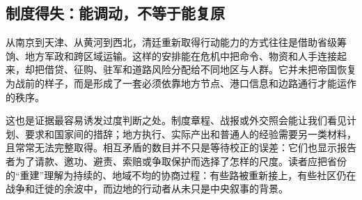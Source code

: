 \subsection{制度得失：能调动，不等于能复原}

从南京到天津、从黄河到西北，清廷重新取得行动能力的方式往往是借助省级筹饷、地方军政和跨区域运输。这样的安排能在危机中把命令、物资和人手连接起来，却把借贷、征购、驻军和道路风险分配给不同地区与人群。它并未把帝国恢复为战前的样子，而是形成了一套必须依靠地方节点、港口信息和边路通行才能运作的秩序。

这也是证据最容易诱发过度判断之处。制度章程、战报或外交照会能让我们看见计划、要求和国家间的措辞；地方执行、实际产出和普通人的经验需要另一类材料，且常常无法完整取得。相互矛盾的数目并不只是等待校正的误差：它们也显示报告者为了请款、邀功、避责、索赔或争取保护而选择了怎样的尺度。读者应把省份的“重建”理解为持续的、地域不均的协商过程：有些路被重新接上，有些社区仍在战争和迁徙的余波中，而边地的行动者从未只是中央叙事的背景。
